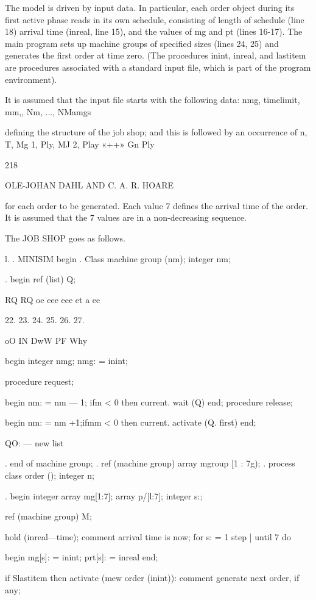 {{{{	The model is driven by input data. In particular, each order object during its first active phase reads in its own schedule, consisting of length of schedule (line 18) arrival time (inreal, line 15), and the values of mg and pt (lines 16-17). The main program sets up machine groups of specified sizes (lines 24, 25) and generates the first order at time zero. (The procedures inint, inreal, and lastitem are procedures associated with a standard input file, which is part of the program environment).
	
	It is assumed that the input file starts with the following data: nmg, timelimit, mm,, Nm, ..., NMamgs
	
	defining the structure of the job shop; and this is followed by an occurrence of n, T, Mg 1, Ply, MJ 2, Play «++» Gn Ply
	
	218
	
	OLE-JOHAN DAHL AND C. A. R. HOARE
	
	for each order to be generated. Each value 7 defines the arrival time of the order. It is assumed that the 7 values are in a non-decreasing sequence.
	
	The JOB SHOP goes as follows.
	
	l. . MINISIM begin . Class machine group (nm); integer nm;
	
	. begin ref (list) Q;
	
	RQ RQ oe eee eee et a ee
	
	22. 23. 24. 25. 26. 27.
	
	oO IN DwW PF Why
	
	begin integer nmg; nmg: = inint;
	
	procedure request;
	
	begin nm: = nm — 1; ifm < 0 then current. wait (Q) end; procedure release;
	
	begin nm: = nm +1;ifmm < 0 then current. activate (Q. first) end;
	
	QO: — new list
	
	. end of machine group; . ref (machine group) array mgroup [1 : 7g); . process class order (); integer n;
	
	. begin integer array mg[1:7]; array p/[l:7]; integer s:;
	
	ref (machine group) M;
	
	hold (inreal—time); comment arrival time is now; for s: = 1 step | until 7 do
	
	begin mg[s]: = inint; prt[s]: = inreal end;
	
	if Slastitem then activate (mew order (inint)): comment generate next order, if any;
	
}}}}
